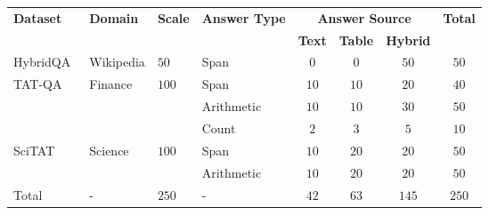 \begin{tabular}{@{}l l l l c c c c@{}}
\toprule
\multirow{2}{*}{\textbf{Dataset}} & \multirow{2}{*}{\textbf{Domain}} & \multirow{2}{*}{\textbf{Scale}} & \multirow{2}{*}{\textbf{Answer Type}} & \multicolumn{3}{c}{\textbf{Answer Source}} & \multirow{2}{*}{\textbf{Total}}\\ 
\cmidrule(lr){5-7}
 & & & & \textbf{Text} & \textbf{Table} & \textbf{Hybrid} \\
\midrule
HybridQA~\cite{chen-etal-2020-hybridqa} & Wikipedia & $50$ & Span & $0$ & $0$ & $50$ & $50$ \\
\midrule
\multirow{3}{*}{TAT-QA~\cite{zhu-etal-2021-tat}} & \multirow{3}{*}{Finance} & \multirow{3}{*}{$100$} & Span & $10$ & $10$ & $20$ & $40$ \\ 
 & & & Arithmetic & $10$ & $10$ & $30$ & $50$ \\ 
 & & & Count & $2$ & $3$ & $5$ & $10$ \\
\midrule
\multirow{2}{*}{SciTAT~\cite{zhang2024scitat}} & \multirow{2}{*}{Science} & \multirow{2}{*}{$100$} & Span & $10$ & $20$ & $20$ & $50$ \\
 & & & Arithmetic & $10$ & $20$ & $20$ & $50$ \\
\midrule
Total & - & $250$ & - & $42$ & $63$ & $145$ & $250$ \\
\bottomrule
\end{tabular}